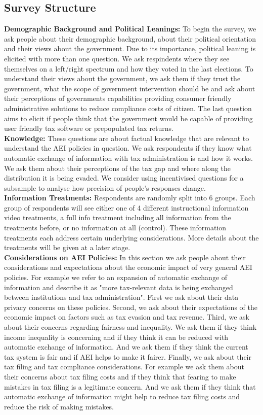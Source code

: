 \documentclass[11pt]{article}
\begin{document}
\subsection{Survey Structure} 
\textbf{Demographic Background and Political Leanings:}
To begin the survey, we ask people about their demographic background, about their political orientation and their views about the government. Due to its importance, political leaning is elicited with more than one question. We ask respindents where they see themselves on a left/right spectrum and how they voted in the last elections. To understand their views about the government, we ask them if they trust the government, what the scope of government intervention should be and ask about their perceptions of governments capabilities providing consumer friendly administrative solutions to reduce compliance costs of citizen. The last question aims to elicit if people think that the government would be capable of providing user friendly tax software or prepopulated tax returns. \\[0.5em]
\textbf{Knowledge:}
These questions are about factual knowledge that are relevant to understand the AEI policies in question. We ask respondents if they know what automatic exchange of information with tax administration is and how it works. We ask them about their perceptions of the tax gap and where along the distribution it is being evaded. We consider using incentivised questions for a subsample to analyse how precision of people's responses change.  \\[0.5em]
\textbf{Information Treatments:}
Respondents are randomly split into 6 groups. Each group of respondents will see either one of 4 different instructional information video treatments, a full info treatment including all information from the treatments before, or no information at all (control). These information treatments each address certain underlying considerations. More details about the treatments will be given at a later stage.\\[0.5em]
\textbf{Considerations on AEI Policies:}
In this section we ask people about their considerations and expectations about the economic impact of very general AEI policies. For example we refer to an expansion of automatic exchange of information and describe it as "more tax-relevant data is being exchanged between institutions and tax administration". First we ask about their data privacy concerns on these policies. Second, we ask about their expectations of the economic impact on factors such as tax evasion and tax revenue. Third, we ask about their concerns regarding fairness and inequality. We ask them if they think income inequality is concerning and if they think it can be reduced with automatic exchange of information. And we ask them if they think the current tax system is fair and if AEI helps to make it fairer. Finally, we ask about their tax filing and tax compliance considerations. For example we ask them about their concerns about tax filing costs and if they think that fearing to make mistakes in tax filing is a legitimate concern.  And we ask them if they think that automatic exchange of information might help to reduce tax filing costs and reduce the risk of making mistakes. \\[0.5em]
\end{document}
